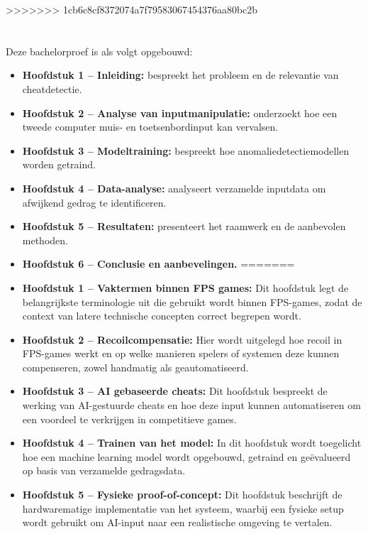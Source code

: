 >>>>>>> 1cb6c8cf8372074a7f79583067454376aa80bc2b
\section{}%
\label{sec:opzet-bachelorproef}

Deze bachelorproef is als volgt opgebouwd:

\begin{itemize}
<<<<<<< HEAD
    \item \textbf{Hoofdstuk 1 – Inleiding:} bespreekt het probleem en de relevantie van cheatdetectie.
    \item \textbf{Hoofdstuk 2 – Analyse van inputmanipulatie:} onderzoekt hoe een tweede computer muis- en toetsenbordinput kan vervalsen.
    \item \textbf{Hoofdstuk 3 – Modeltraining:} bespreekt hoe anomaliedetectiemodellen worden getraind.
    \item \textbf{Hoofdstuk 4 – Data-analyse:} analyseert verzamelde inputdata om afwijkend gedrag te identificeren.
    \item \textbf{Hoofdstuk 5 – Resultaten:} presenteert het raamwerk en de aanbevolen methoden.
    \item \textbf{Hoofdstuk 6 – Conclusie en aanbevelingen.}
=======
    \item \textbf{Hoofdstuk 1 – Vaktermen binnen FPS games:} Dit hoofdstuk legt de belangrijkste terminologie uit die gebruikt wordt binnen FPS-games, zodat de context van latere technische concepten correct begrepen wordt.
    
    \item \textbf{Hoofdstuk 2 – Recoilcompensatie:} Hier wordt uitgelegd hoe recoil in FPS-games werkt en op welke manieren spelers of systemen deze kunnen compenseren, zowel handmatig als geautomatiseerd.
    
    \item \textbf{Hoofdstuk 3 – AI gebaseerde cheats:} Dit hoofdstuk bespreekt de werking van AI-gestuurde cheats en hoe deze input kunnen automatiseren om een voordeel te verkrijgen in competitieve games.
    
    \item \textbf{Hoofdstuk 4 – Trainen van het model:} In dit hoofdstuk wordt toegelicht hoe een machine learning model wordt opgebouwd, getraind en geëvalueerd op basis van verzamelde gedragsdata.
    
    \item \textbf{Hoofdstuk 5 – Fysieke proof-of-concept:} Dit hoofdstuk beschrijft de hardwarematige implementatie van het systeem, waarbij een fysieke setup wordt gebruikt om AI-input naar een realistische omgeving te vertalen.
    

\end{itemize}
